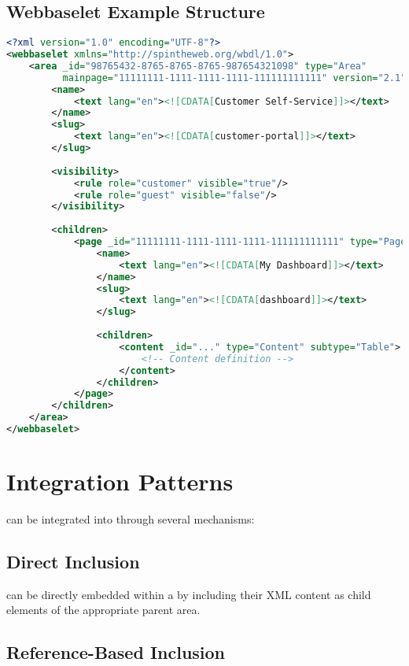 \subsection{Webbaselet Example Structure}

\begin{lstlisting}[language=XML,caption={Example Webbaselet Structure}]
<?xml version="1.0" encoding="UTF-8"?>
<webbaselet xmlns="http://spintheweb.org/wbdl/1.0">
    <area _id="98765432-8765-8765-8765-987654321098" type="Area" 
          mainpage="11111111-1111-1111-1111-111111111111" version="2.1">
        <name>
            <text lang="en"><![CDATA[Customer Self-Service]]></text>
        </name>
        <slug>
            <text lang="en"><![CDATA[customer-portal]]></text>
        </slug>
        
        <visibility>
            <rule role="customer" visible="true"/>
            <rule role="guest" visible="false"/>
        </visibility>
        
        <children>
            <page _id="11111111-1111-1111-1111-111111111111" type="Page">
                <name>
                    <text lang="en"><![CDATA[My Dashboard]]></text>
                </name>
                <slug>
                    <text lang="en"><![CDATA[dashboard]]></text>
                </slug>
                
                <children>
                    <content _id="..." type="Content" subtype="Table">
                        <!-- Content definition -->
                    </content>
                </children>
            </page>
        </children>
    </area>
</webbaselet>
\end{lstlisting}

\section{Integration Patterns}
\label{sec:integration-patterns}

 can be integrated into  through several mechanisms:

\subsection{Direct Inclusion}

 can be directly embedded within a \webbase{} by including their XML content as child elements of the appropriate parent area.

\subsection{Reference-Based Inclusion}

